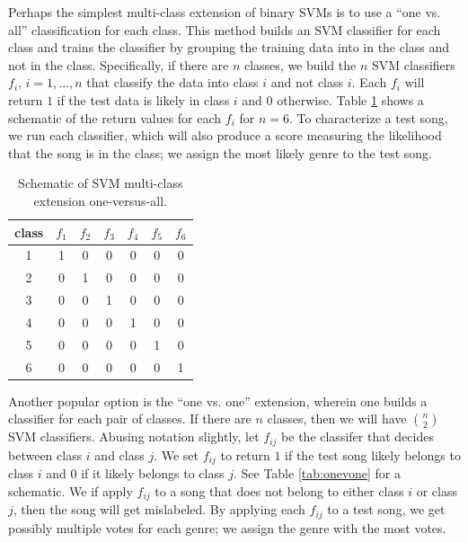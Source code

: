 \documentclass[12pt]{article}
\begin{document}
Perhaps the simplest multi-class extension of binary SVMs is to use a ``one vs. all'' classification for each class.  This method builds an SVM classifier for each class and trains the classifier by grouping the training data into in the class and not in the class.  Specifically, if there are $n$ classes, we build the $n$ SVM classifiers $f_i$, $i=1,...,n$ that classify the data into class $i$ and not class $i$.  Each $f_i$ will return $1$ if the test data is likely in class $i$ and $0$ otherwise.  Table \ref{tab:onevall} shows a schematic of the return values for each $f_i$ for $n=6$.  To characterize a test song, we run each classifier, which will also produce a score measuring the likelihood that the song is in the class; we assign the most likely genre to the test song.\\

\begin{table}[h!]
   \centering
   \begin{tabular}{|c|cccccc|}
      \hline
      class&$f_1$ & $f_2$ & $f_3$ & $f_4$ & $f_5$ & $f_6$\\\hline
      1 & 1 & 0 & 0 & 0 &0 &0\\\hline
      2 & 0 & 1 & 0 & 0 & 0 & 0\\\hline
      3 & 0 & 0 & 1 & 0 & 0 & 0\\\hline
      4 & 0 & 0 & 0 & 1 & 0 & 0\\\hline
      5 & 0 & 0 & 0 & 0 & 1 & 0\\\hline
      6 & 0 & 0 & 0 & 0 & 0 & 1\\\hline
   \end{tabular}
   \caption{Schematic of SVM multi-class extension one-versus-all.}
   \label{tab:onevall}
\end{table}

Another popular option is the ``one vs. one'' extension, wherein one builds a classifier for each pair of classes.  If there are $n$ classes, then we will have $\binom n 2$ SVM classifiers.  Abusing notation slightly, let $f_{ij}$ be the classifer that decides between class $i$ and class $j$.  We set $f_{ij}$ to return $1$ if the test song likely belongs to class $i$ and $0$ if it likely belongs to class $j$.  See Table \ref{tab:onevone} for a schematic.  We if apply $f_{ij}$ to a song that does not belong to either class $i$ or class $j$, then the song will get mislabeled.  By applying each $f_{ij}$ to a test song, we get possibly multiple votes for each genre; we assign the genre with the most votes.\\
\end{document}
